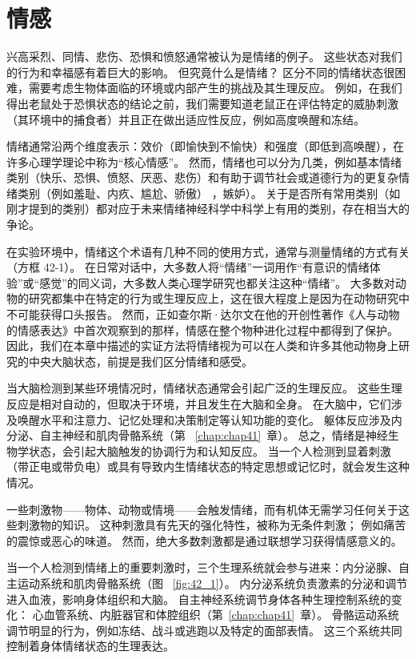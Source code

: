 \chapter{情感} \label{chap:chap42}

兴高采烈、同情、悲伤、恐惧和愤怒通常被认为是情绪的例子。
这些状态对我们的行为和幸福感有着巨大的影响。
但究竟什么是情绪？
区分不同的情绪状态很困难，需要考虑生物体面临的环境或内部产生的挑战及其生理反应。
例如，在我们得出老鼠处于恐惧状态的结论之前，我们需要知道老鼠正在评估特定的威胁刺激（其环境中的捕食者）并且正在做出适应性反应，例如高度唤醒和冻结。


情绪通常沿两个维度表示：效价（即愉快到不愉快）和强度（即低到高唤醒），在许多心理学理论中称为“核心情感”。
然而，情绪也可以分为几类，例如基本情绪类别（快乐、恐惧、愤怒、厌恶、悲伤）和有助于调节社会或道德行为的更复杂情绪类别（例如羞耻、内疚、尴尬、骄傲） ，嫉妒）。
关于是否所有常用类别（如刚才提到的类别）都对应于未来情绪神经科学中科学上有用的类别，存在相当大的争论。


在实验环境中，情绪这个术语有几种不同的使用方式，通常与测量情绪的方式有关（方框 42-1）。
在日常对话中，大多数人将“情绪”一词用作“有意识的情绪体验”或“感觉”的同义词，大多数人类心理学研究也都关注这种“情绪”。
大多数对动物的研究都集中在特定的行为或生理反应上，这在很大程度上是因为在动物研究中不可能获得口头报告。
然而，正如查尔斯·达尔文在他的开创性著作《人与动物的情感表达》中首次观察到的那样，情感在整个物种进化过程中都得到了保护。 因此，我们在本章中描述的实证方法将情绪视为可以在人类和许多其他动物身上研究的中央大脑状态，前提是我们区分情绪和感受。

当大脑检测到某些环境情况时，情绪状态通常会引起广泛的生理反应。 这些生理反应是相对自动的，但取决于环境，并且发生在大脑和全身。 在大脑中，它们涉及唤醒水平和注意力、记忆处理和决策制定等认知功能的变化。 躯体反应涉及内分泌、自主神经和肌肉骨骼系统（第 ~\ref{chap:chap41}~章）。
总之，情绪是神经生物学状态，会引起大脑触发的协调行为和认知反应。
当一个人检测到显着刺激（带正电或带负电）或具有导致内生情绪状态的特定思想或记忆时，就会发生这种情况。


一些刺激物——物体、动物或情境——会触发情绪，而有机体无需学习任何关于这些刺激物的知识。
这种刺激具有先天的强化特性，被称为无条件刺激；
例如痛苦的震惊或恶心的味道。
然而，绝大多数刺激都是通过联想学习获得情感意义的。


当一个人检测到情绪上的重要刺激时，三个生理系统就会参与进来：内分泌腺、自主运动系统和肌肉骨骼系统（图 ~\ref{fig:42_1}）。 
内分泌系统负责激素的分泌和调节进入血液，影响身体组织和大脑。
自主神经系统调节身体各种生理控制系统的变化：
心血管系统、内脏器官和体腔组织（第~\ref{chap:chap41}~章）。
骨骼运动系统调节明显的行为，例如冻结、战斗或逃跑以及特定的面部表情。
这三个系统共同控制着身体情绪状态的生理表达。


